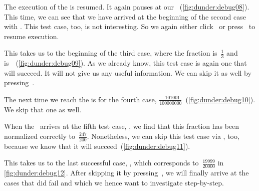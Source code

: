 The execution of the  is resumed.
It again pauses at our ~(\cref{fig:dunder:debug08}).
This time, we can see that we have arrived at the beginning of the second  case with .
This test case, too, is not interesting.
So we again either click \pycharmDebuggerResume\ or press~ to resume execution.

This takes us to the beginning of the third  case, where the fraction is~$\frac{1}{3}$ and  is~~(\cref{fig:dunder:debug09}).
As we already know, this test case is again one that will succeed.
It will not give us any useful information.
We can skip it as well by pressing~.

The next time we reach the  is for the fourth  case, $\frac{-101001}{100000000}$~(\cref{fig:dunder:debug10}).
We skip that one as well.

When the \debugger\ arrives at the fifth test case, , we find that this fraction has been normalized correctly to~$\frac{247}{200}$.
Nonetheless, we can skip this test case via , too, because we know that it will succeed~(\cref{fig:dunder:debug11}).

This takes us to the last successful  case, , which corresponds to~$\frac{19999}{20000}$ in \cref{fig:dunder:debug12}.
After skipping it by pressing~\pycharmDebuggerResume, we will finally arrive at the cases that did fail and which we hence want to investigate step-by-step.

